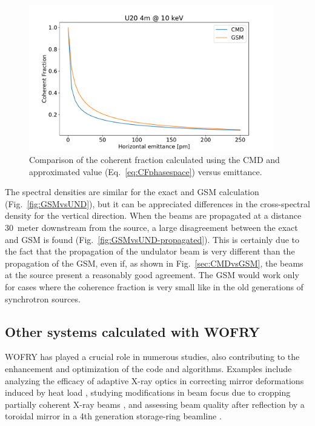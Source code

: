 \documentclass{iopconfser}
\begin{document}
\begin{figure}
    \centering
    \includegraphics[width=0.95\textwidth]{figures/CFvsEmittance.pdf}
        
    \caption{Comparison of the coherent fraction calculated using the CMD and approximated value (Eq.~\ref{eq:CFphasespace}) versus emittance.}
    \label{fig:CFvsEmittance}
\end{figure}


The spectral densities are similar for the exact and GSM calculation (Fig.~\ref{fig:GSMvsUND}), but it can be appreciated differences in the cross-spectral density for the vertical direction.
When the beams are propagated at a distance \SI{30}{meter} downstream from the source, a large disagreement between the exact and GSM is found (Fig.~\ref{fig:GSMvsUND-propagated}). This is certainly due to the fact that the propagation of the undulator beam is very different than the propagation of the GSM, even if, as shown in Fig.~\ref{sec:CMDvsGSM}, the beams at the source present a reasonably good agreement. The GSM would work only for cases where the coherence fraction is very small like in the old generations of synchrotron sources.

\subsection{Other systems calculated with WOFRY}

WOFRY has played a crucial role in numerous studies, also contributing to the enhancement and optimization of the code and algorithms. Examples include analyzing the efficacy of adaptive X-ray optics in correcting mirror deformations induced by heat load \citep{SanchezdelRio2020}, studying modifications in beam focus due to cropping partially coherent X-ray beams \citep{SanchezdelRio2022EPL}, and assessing beam quality after reflection by a toroidal mirror in a 4th generation storage-ring beamline \citep{ReyesHerrera2023}.
\end{document}
